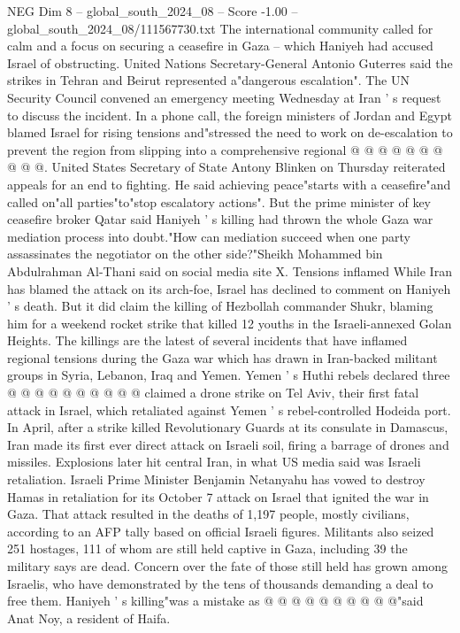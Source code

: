 \begin{textsample}{NEG Dim 8 – global\_south\_2024\_08 – Score -1.00 – global\_south\_2024\_08/111567730.txt}
The international community called for calm and a focus on securing a ceasefire in Gaza -- which Haniyeh had accused Israel of obstructing.
United Nations Secretary-General Antonio Guterres said the strikes in Tehran and Beirut represented a"dangerous escalation".
The UN Security Council convened an emergency meeting Wednesday at Iran ' s request to discuss the incident.
In a phone call, the foreign ministers of Jordan and Egypt blamed Israel for rising tensions and"stressed the need to work on de-escalation to prevent the region from slipping into a comprehensive regional @ @ @ @ @ @ @ @ @ @.
United States Secretary of State Antony Blinken on Thursday reiterated appeals for an end to fighting.
He said achieving peace"starts with a ceasefire"and called on"all parties"to"stop escalatory actions".
But the prime minister of key ceasefire broker Qatar said Haniyeh ' s killing had thrown the whole Gaza war mediation process into doubt."How can mediation succeed when one party assassinates the negotiator on the other side?"Sheikh Mohammed bin Abdulrahman Al-Thani said on social media site X.
Tensions inflamed While Iran has blamed the attack on its arch-foe, Israel has declined to comment on Haniyeh ' s death.
But it did claim the killing of Hezbollah commander Shukr, blaming him for a weekend rocket strike that killed 12 youths in the Israeli-annexed Golan Heights.
The killings are the latest of several incidents that have inflamed regional tensions during the Gaza war which has drawn in Iran-backed militant groups in Syria, Lebanon, Iraq and Yemen.
Yemen ' s Huthi rebels declared three @ @ @ @ @ @ @ @ @ @ claimed a drone strike on Tel Aviv, their first fatal attack in Israel, which retaliated against Yemen ' s rebel-controlled Hodeida port.
In April, after a strike killed Revolutionary Guards at its consulate in Damascus, Iran made its first ever direct attack on Israeli soil, firing a barrage of drones and missiles.
Explosions later hit central Iran, in what US media said was Israeli retaliation.
Israeli Prime Minister Benjamin Netanyahu has vowed to destroy Hamas in retaliation for its October 7 attack on Israel that ignited the war in Gaza.
That attack resulted in the deaths of 1,197 people, mostly civilians, according to an AFP tally based on official Israeli figures.
Militants also seized 251 hostages, 111 of whom are still held captive in Gaza, including 39 the military says are dead.
Concern over the fate of those still held has grown among Israelis, who have demonstrated by the tens of thousands demanding a deal to free them.
Haniyeh ' s killing"was a mistake as @ @ @ @ @ @ @ @ @ @"said Anat Noy, a resident of Haifa.

\end{textsample}
